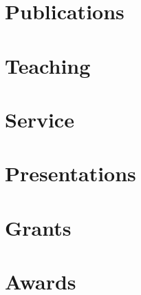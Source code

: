 \documentclass[10pt]{article}
\begin{document}
\section*{Publications}

\section*{Teaching}

\section*{Service}

\section*{Presentations}

\section*{Grants}

\section*{Awards}
\end{document}
